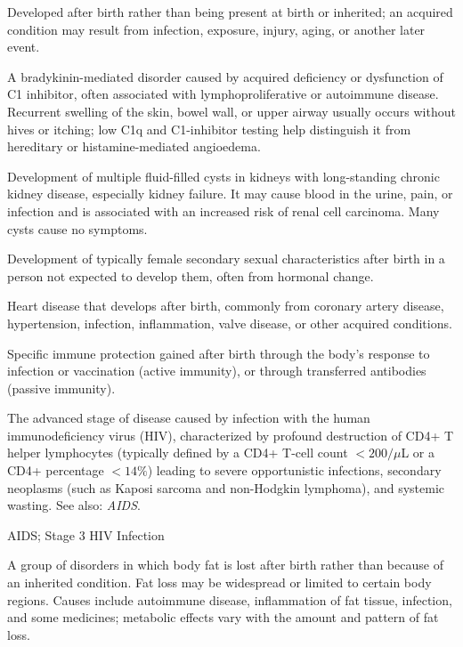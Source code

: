  Developed after birth rather than being present at birth or inherited; an acquired condition may result from infection, exposure, injury, aging, or another later event.

 A bradykinin-mediated disorder caused by acquired deficiency or dysfunction of C1 inhibitor, often associated with lymphoproliferative or autoimmune disease. Recurrent swelling of the skin, bowel wall, or upper airway usually occurs without hives or itching; low C1q and C1-inhibitor testing help distinguish it from hereditary or histamine-mediated angioedema.

 Development of multiple fluid-filled cysts in
kidneys with long-standing chronic kidney disease, especially kidney failure. It may cause
blood in the urine, pain, or infection and is associated with an increased risk of renal cell
carcinoma. Many cysts cause no symptoms.

 Development of typically female secondary sexual characteristics after birth in a person not expected to develop them, often from hormonal change.

 Heart disease that develops after birth, commonly from coronary artery disease, hypertension, infection, inflammation, valve disease, or other acquired conditions.

 Specific immune protection gained after birth through the body's response to infection or vaccination (active immunity), or through transferred antibodies (passive immunity).

 The advanced stage of disease caused by infection with the human immunodeficiency virus (HIV), characterized by profound destruction of CD4+ T helper lymphocytes (typically defined by a CD4+ T-cell count $< 200/\mu$L or a CD4+ percentage $< 14\%$) leading to severe opportunistic infections, secondary neoplasms (such as Kaposi sarcoma and non-Hodgkin lymphoma), and systemic wasting. See also: \textit{AIDS}.

\synonyms
AIDS; Stage 3 HIV Infection

 A group of disorders in which body fat is lost after birth rather than because of an inherited condition. Fat loss may be widespread or limited to certain body regions. Causes include autoimmune disease, inflammation of fat tissue, infection, and some medicines; metabolic effects vary with the amount and pattern of fat loss.

